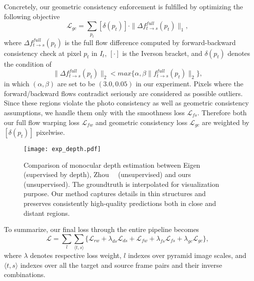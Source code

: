 Concretely, our geometric consistency enforcement is fulfilled by optimizing the following objective
\begin{equation}
    \label{equa::cst}
\mathcal{L}_{gc} = \sum_{p_t} [\delta(p_t)]\cdot\|\Delta f_{t\to s}^{full}(p_t)\|_1, 
\end{equation}
where $\Delta f_{t\to s}^{full}(p_t)$ is the full flow difference computed by forward-backward consistency check at pixel $p_t$ in $I_t$, $[\cdot]$ is the Iverson bracket, and $\delta(p_t)$ denotes the condition of  
\begin{equation}
\|\Delta f_{t\to s}^{full}(p_t)\|_2<max\{\alpha, \beta\|f_{t\to s}^{full}(p_t)\|_2\},
\end{equation}
in which $(\alpha,\beta)$ are set to be $(3.0,0.05)$ in our experiment. 
Pixels where the forward/backward flows contradict seriously are considered as possible outliers. Since these regions violate the photo consistency as well as geometric consistency assumptions, we handle them only with the smoothness loss $\mathcal{L}_{fs}$. 
Therefore both our full flow warping loss $\mathcal{L}_{fw}$ and geometric consistency loss $\mathcal{L}_{gc}$ are weighted by $[\delta(p_t)]$ pixelwise.

\iffalse
\begin{equation}
\mathcal{L}_{t\to s}^{fw}=\sum_{p_t\in I_t}P_{t\to s}^{noc}(p_t)\mathcal{C}(I_t,\tilde{I}_s^{fin})(p_t)
\end{equation}

\begin{equation}
\mathcal{L}_{t\to s}^{fc}=\sum_{p_t\in I_t}P_{t\to s}^{noc}(p_t)|\Delta f_{t\to s}(p_t)|
\end{equation}
\fi

\begin{figure*}[t]
\begin{center}
   \texttt{[image: exp\_depth.pdf]}
\end{center}
\vspace{-1ex}
   \caption{Comparison of monocular depth estimation between Eigen~\etal~\cite{EigenPF14} (supervised by depth), Zhou~\etal~\cite{zhou2017unsupervised} (unsupervised) and ours (unsupervised). The groundtruth is interpolated for visualization purpose. Our method captures details in thin structures and preserves consistently high-quality predictions both in close and distant regions.}
   \vspace{-2ex}
\label{fig::exp_depth}
\end{figure*}



To summarize, our final loss through the entire pipeline becomes
\begin{equation}
\mathcal{L}=\sum_{l}\sum_{\langle t,s \rangle}\{\mathcal{L}_{rw}+\lambda_{ds}\mathcal{L}_{ds}+\mathcal{L}_{fw}+\lambda_{fs}\mathcal{L}_{fs}+\lambda_{gc}\mathcal{L}_{gc}\},
\end{equation}
where $\lambda$ denotes respective loss weight, $l$ indexes over pyramid image scales, and $\langle t,s \rangle$ indexes over all the target and source frame pairs and their inverse combinations. 


